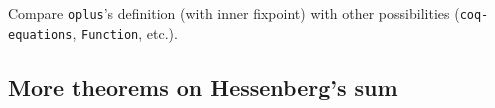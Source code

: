 






\begin{project}
Compare \texttt{oplus}'s definition (with inner fixpoint) with other possibilities
(\texttt{coq-equations}, \texttt{Function}, etc.).
\end{project}
\subsection{More theorems on Hessenberg's sum}

